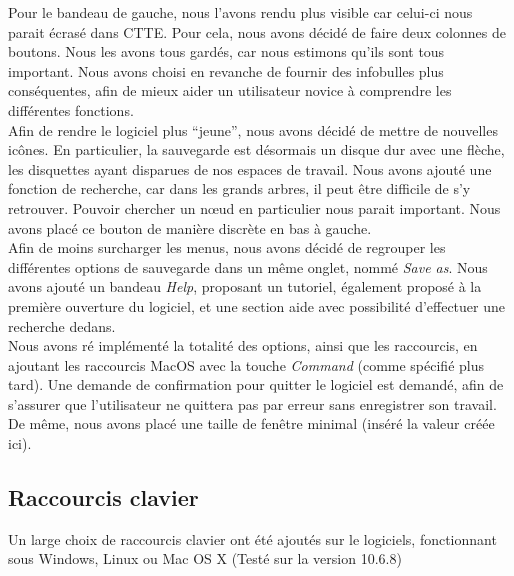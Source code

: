 \documentclass[12pt, a4paper]{article}
\begin{document}
Pour le bandeau de gauche, nous l'avons rendu plus visible car celui-ci nous parait écrasé dans CTTE. Pour cela, nous avons décidé de faire deux colonnes de boutons. Nous les avons tous gardés, car nous estimons qu'ils sont tous important. Nous avons choisi en revanche de fournir des infobulles plus conséquentes, afin de mieux aider un utilisateur novice à comprendre les différentes fonctions.\\


Afin de rendre le logiciel plus ``jeune'', nous avons décidé de mettre de nouvelles icônes. En particulier, la sauvegarde est désormais un disque dur avec une flèche, les disquettes ayant disparues de nos espaces de travail. Nous avons ajouté une fonction de recherche, car dans les grands arbres, il peut être difficile de s'y retrouver. Pouvoir chercher un nœud en particulier nous parait important. Nous avons placé ce bouton de manière discrète en bas à gauche.\\


Afin de moins surcharger les menus, nous avons décidé de regrouper les différentes options de sauvegarde dans un même onglet, nommé \emph{Save as}. Nous avons ajouté un bandeau \emph{Help}, proposant un tutoriel, également proposé à la première ouverture du logiciel, et une section aide avec possibilité d'effectuer une recherche dedans.\\


Nous avons ré implémenté la totalité des options, ainsi que les raccourcis, en ajoutant les raccourcis MacOS avec la touche \emph{Command} (comme spécifié plus tard). Une demande de confirmation pour quitter le logiciel est demandé, afin de s'assurer que l'utilisateur ne quittera pas par erreur sans enregistrer son travail. De même, nous avons placé une taille de fenêtre minimal (inséré la valeur créée ici).

\textcolor{NavyBlue}{\subsection{Raccourcis clavier}}

Un large choix de raccourcis clavier ont été ajoutés sur le logiciels, fonctionnant sous Windows, Linux ou Mac OS X (Testé sur la version 10.6.8)
\end{document}
